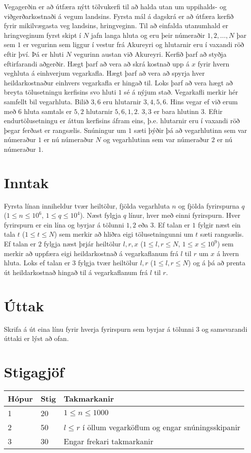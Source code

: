 %
Vegagerðin er að útfæra nýtt tölvukerfi til að halda utan um uppihalds- og viðgerðarkostnaði á vegum landsins.
Fyrsta mál á dagskrá er að útfæra kerfið fyrir mikilvægasta veg landsins, hringveginn. Til að einfalda utanumhald
er hringveginum fyrst skipt í $N$ jafn langa hluta og eru þeir númeraðir $1, 2, \dots, N$ þar sem $1$ er vegurinn
sem liggur í vestur frá Akureyri og hlutarnir eru í vaxandi röð eftir því. Þá er hluti $N$ vegurinn austan við
Akureyri. Kerfið þarf að styðja eftirfarandi aðgerðir. Hægt þarf að vera að skrá kostnað upp á $x$ fyrir hvern
veghluta á einhverjum vegarkafla. Hægt þarf að vera að spyrja hver heildarkostnaður einhvers vegarkafla er
hingað til. Loks þarf að vera hægt að breyta tölusetningu kerfisins svo hluti $1$ sé á nýjum stað. Vegarkafli
merkir hér samfellt bil vegarhluta. Bilið $3, 6$ eru hlutarnir $3, 4, 5, 6$. Hins vegar ef við erum með $6$ hluta
samtals er $5, 2$ hlutarnir $5, 6, 1, 2$. $3, 3$ er bara hlutinn $3$. Eftir endurtölusetningu er áttun kerfisins
áfram eins, þ.e. hlutarnir eru í vaxandi röð þegar ferðast er rangsælis. Snúningur um $1$ sæti þýðir þá að vegarhlutinn sem var númeraður $1$ er nú númeraður $N$ og vegarhlutinn sem var númeraður $2$ er nú númeraður $1$.

\section*{Inntak}
Fyrsta línan inniheldur tvær heiltölur, fjölda vegarhluta $n$ og fjölda fyrirspurna $q$ ($1 \leq n \leq 10^6$, $1 \leq q \leq 10^4$). Næst fylgja $q$ línur, hver með einni fyrirspurn. Hver fyrirspurn er ein lína og byrjar á tölunni $1, 2$ eða $3$. Ef talan er $1$ fylgir næst ein tala $t$ ($1 \leq t \leq N$) sem merkir að hliðra eigi tölusetningunni um $t$ sæti rangsælis. Ef talan er $2$ fylgja næst þrjár heiltölur $l, r, x$ ($1 \leq l, r \leq N$, $1 \leq x \leq 10^9$) sem merkir að uppfæra eigi heildarkostnað á vegarkaflanum frá $l$ til $r$ um $x$ á hvern hluta. Loks ef talan er $3$ fylgja tvær heiltölur $l, r$ ($1 \leq l, r \leq N$) og á þá að prenta út heildarkostnað hingað til á vegarkaflanum frá $l$ til $r$.

\section*{Úttak}
Skrifa á út eina línu fyrir hverja fyrirspurn sem byrjar á tölunni $3$ og samsvarandi úttaki er lýst að ofan.

\section*{Stigagjöf}
\begin{tabular}{|l|l|l|}
\hline
Hópur & Stig & Takmarkanir \\ \hline
1     & 20   & $1 \leq n \leq 1000$ \\ \hline
2     & 50   & $l \leq r$ í öllum vegarköflum og engar snúningsskipanir \\ \hline
3     & 30   & Engar frekari takmarkanir \\ \hline
\end{tabular}


